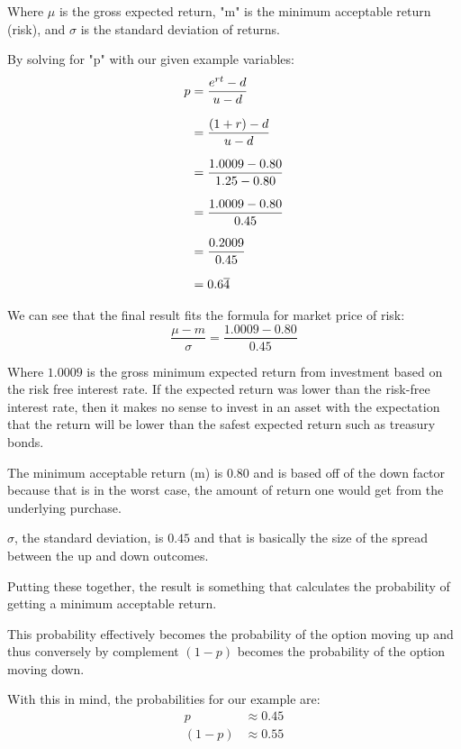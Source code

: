 \documentclass[12pt, letterpaper]{article}
\begin{document}
Where $\mu$ is the gross expected return, "m" is the minimum acceptable return (risk), and $\sigma$ is the standard deviation of returns.

By solving for "p" with our given example variables:
\begin{equation*}
  \setlength{\jot}{10pt}
  \begin{split}
    p
    & = \frac{e^{rt} - d}{u - d}
    \\
    & = \frac{(1+r) - d}{u - d}
    \\
    & = \frac{1.0009 - 0.80}{1.25 - 0.80}
    \\
    & = \frac{1.0009 - 0.80}{0.45}
    \\
    & = \frac{0.2009}{0.45}
    \\
    & = 0.6\overline{4}
  \end{split}
\end{equation*}

We can see that the final result fits the formula for market price of risk:
\begin{equation*}
  \frac{\mu - m}{\sigma} = \frac{1.0009 - 0.80}{0.45}
\end{equation*}

Where ${1.0009}$ is the gross minimum expected return from investment based on the risk free interest rate.
If the expected return was lower than the risk-free interest rate, then it makes no sense to invest in an asset with the expectation that the return will be lower than the safest expected return such as treasury bonds.

The minimum acceptable return (m) is ${0.80}$ and is based off of the down factor because that is in the worst case, the amount of return one would get from the underlying purchase.

${\sigma}$, the standard deviation, is ${0.45}$ and that is basically the size of the spread between the up and down outcomes.

Putting these together, the result is something that calculates the probability of getting a minimum acceptable return. %

This probability effectively becomes the probability of the option moving up and thus conversely by complement ${(1-p)}$ becomes the probability of the option moving down.

With this in mind, the probabilities for our example are:
\begin{align*}
  p
  & \approx 0.45
  \\
  (1-p)
  & \approx 0.55
\end{align*}
\end{document}
